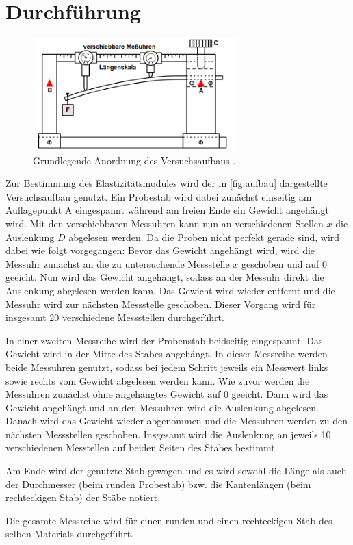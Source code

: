 \section{Durchführung}
\label{sec:Durchführung}
\begin{figure}[h]
    \centering
    \includegraphics[width=0.7\textwidth]{assets/aufbau.png}
    \caption{Grundlegende Anordnung des Versuchsaufbaus \cite{V103}.}
    \label{fig:aufbau}
\end{figure}
\noindent Zur Bestimmung des Elastizitätsmodules wird der in \autoref{fig:aufbau} dargestellte Versuchsaufbau genutzt.
Ein Probestab wird dabei zunächst einseitig am Auflagepunkt A eingespannt während am freien Ende ein Gewicht angehängt wird.
Mit den verschiebbaren Messuhren kann nun an verschiedenen Stellen $x$ die Auslenkung $D$ abgelesen werden. Da die
Proben nicht perfekt gerade sind, wird dabei wie folgt vorgegangen:
Bevor das Gewicht angehängt wird, wird die Messuhr zunächst an die zu untersuchende Messstelle $x$ geschoben und auf $0$ geeicht.
Nun wird das Gewicht angehängt, sodass an der Messuhr direkt die Auslenkung abgelesen werden kann. Das Gewicht wird wieder entfernt
und die Messuhr wird zur nächsten Messstelle geschoben. Dieser Vorgang wird für insgesamt 20 verschiedene Messstellen durchgeführt.

\noindent In einer zweiten Messreihe wird der Probenstab beidseitig eingespannt. Das Gewicht wird in der Mitte des Stabes angehängt. In dieser
Messreihe werden beide Messuhren genutzt, sodass bei jedem Schritt jeweils ein Messwert links sowie rechts vom Gewicht abgelesen werden kann.
Wie zuvor werden die Messuhren zunächst ohne angehängtes Gewicht auf 0 geeicht. Dann wird das Gewicht angehängt und an den Messuhren wird die Auslenkung abgelesen.
Danach wird das Gewicht wieder abgenommen und die Messuhren werden zu den nächsten Messstellen geschoben. Insgesamt wird die Auslenkung an jeweils 10 verschiedenen
Messtellen auf beiden Seiten des Stabes bestimmt.

\noindent Am Ende wird der genutzte Stab gewogen und es wird sowohl die Länge als auch der Durchmesser (beim runden Probestab) bzw. die Kantenlängen (beim rechteckigen Stab)
der Stäbe notiert.

\noindent Die gesamte Messreihe wird für einen runden und einen rechteckigen Stab des selben Materials durchgeführt.